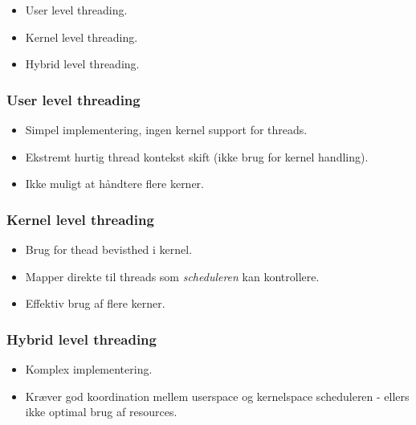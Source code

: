 \begin{itemize}
	\item User level threading.
	\item Kernel level threading.
	\item Hybrid level threading.
\end{itemize}

\subsubsection*{User level threading}
\begin{itemize}
	\item Simpel implementering, ingen kernel support for threads.
	\item Ekstremt hurtig thread kontekst skift (ikke brug for kernel handling).
	\item Ikke muligt at håndtere flere kerner.
\end{itemize}


\subsubsection*{Kernel level threading}
\begin{itemize}
	\item Brug for thead bevisthed i kernel.
	\item Mapper direkte til threads som \textit{scheduleren} kan kontrollere.
	\item Effektiv brug af flere kerner.
\end{itemize}


\subsubsection*{Hybrid level threading}
\begin{itemize}
	\item Komplex implementering.
	\item Kræver god koordination mellem userspace og kernelspace scheduleren - ellers ikke optimal brug af resources.
\end{itemize}

